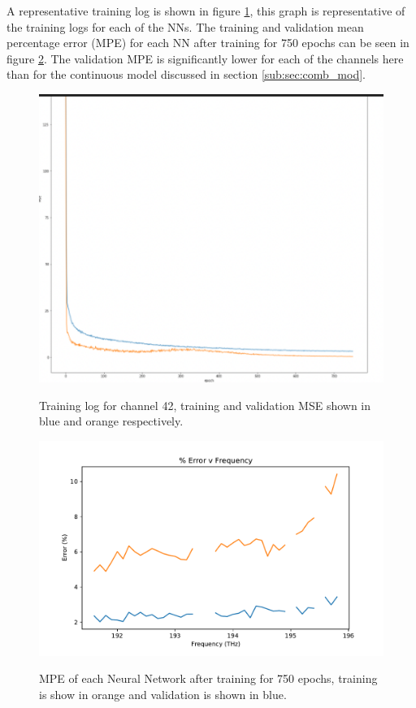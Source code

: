 A representative training log is shown in figure \ref{fig:ml_model:disc_train_log}, this graph is representative of the training logs for each of the NNs. The training and validation mean percentage error (MPE) for each NN after training for 750 epochs can be seen in figure \ref{fig:ml_model:disc_train_val}. The validation MPE is significantly lower for each of the channels here than for the continuous model discussed in section \ref{sub:sec:comb_mod}.



\begin{figure}
    \centering
    \caption{Training log for channel 42, training and validation MSE shown in blue and orange respectively.}
    \includegraphics[width=\textwidth]{project/img/ml_model/singel_training_log.png}
    \label{fig:ml_model:disc_train_log}
\end{figure}


\begin{figure}
    \centering
    \caption{MPE of each Neural Network after training for 750 epochs, training is show in orange and validation is shown in blue.}
    \includegraphics[width=\textwidth]{project/img/ml_model/comb_t_v_pct_err.pdf}
    \label{fig:ml_model:disc_train_val}
\end{figure}


